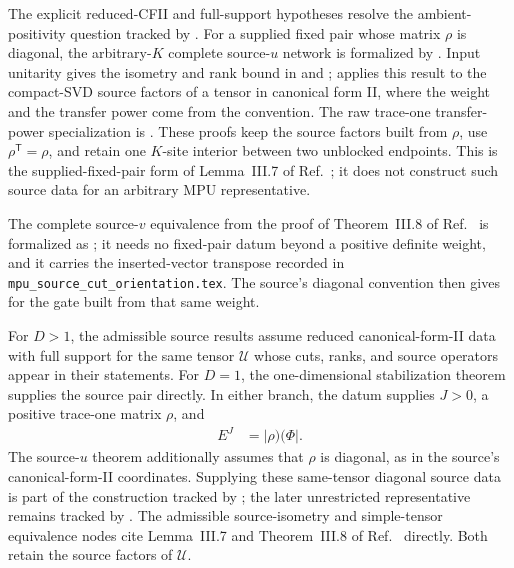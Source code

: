 \documentclass{article}
\begin{document}
The explicit reduced-CFII and full-support hypotheses resolve the
ambient-positivity question tracked by . For a supplied fixed
pair whose matrix $\rho$ is diagonal, the arbitrary-$K$ complete source-$u$
network is formalized by
.
Input unitarity gives the isometry and rank bound in
 and
;
 applies this result
to the compact-SVD source factors of a tensor in canonical form II, where the
weight and the transfer power come from the convention. The raw trace-one transfer-power specialization is
.
These proofs keep the source factors built from $\rho$, use
$\rho^{\mathsf T}=\rho$, and retain one $K$-site interior between two
unblocked endpoints. This is the supplied-fixed-pair form of Lemma~III.7 of
Ref.~\cite{Cirac2017MPU}; it does not construct such source data for an
arbitrary MPU representative.

The complete source-$v$ equivalence from the proof of Theorem~III.8 of
Ref.~\cite{Cirac2017MPU} is formalized as
; it
needs no fixed-pair datum beyond a positive definite weight, and it carries
the inserted-vector transpose recorded in
\texttt{mpu\_source\_cut\_orientation.tex}. The source's diagonal convention
then gives  for the
gate built from that same weight.

For $D>1$, the admissible source results assume reduced canonical-form-II data
with full support for the same tensor $\mathcal U$ whose cuts, ranks, and source
operators appear in their statements. For $D=1$, the one-dimensional
stabilization theorem supplies the source pair directly. In either branch, the
datum supplies $J>0$, a positive trace-one matrix $\rho$, and
\begin{align}
    E^J & = \lvert\rho)(\Phi\rvert.
    \label{eq:mpu_canonical_form_full_support_supplied_stabilization}
\end{align}
The source-$u$ theorem additionally assumes that $\rho$ is diagonal, as in the
source's canonical-form-II coordinates. Supplying these same-tensor diagonal
source data is part of the construction tracked by ; the later
unrestricted representative remains tracked by . The admissible
source-isometry and simple-tensor equivalence nodes cite Lemma~III.7 and
Theorem~III.8 of Ref.~\cite{Cirac2017MPU} directly. Both retain the source
factors of $\mathcal U$.
\end{document}
